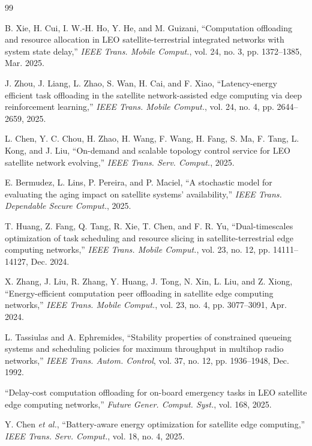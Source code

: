 \documentclass[a4paper,11pt]{article}
\begin{document}
\begin{thebibliography}{99}

B. Xie, H. Cui, I. W.-H. Ho, Y. He, and M. Guizani,
``Computation offloading and resource allocation in LEO
satellite-terrestrial integrated networks with system state delay,''
\textit{IEEE Trans. Mobile Comput.},
vol. 24, no. 3, pp. 1372--1385, Mar. 2025.

J. Zhou, J. Liang, L. Zhao, S. Wan, H. Cai, and F. Xiao,
``Latency-energy efficient task offloading in the satellite
network-assisted edge computing via deep reinforcement learning,''
\textit{IEEE Trans. Mobile Comput.},
vol. 24, no. 4, pp. 2644--2659, 2025.

L. Chen, Y. C. Chou, H. Zhao, H. Wang, F. Wang, H. Fang, S. Ma,
F. Tang, L. Kong, and J. Liu,
``On-demand and scalable topology control service for LEO
satellite network evolving,''
\textit{IEEE Trans. Serv. Comput.}, 2025.

E. Bermudez, L. Lins, P. Pereira, and P. Maciel,
``A stochastic model for evaluating the aging impact on
satellite systems' availability,''
\textit{IEEE Trans. Dependable Secure Comput.}, 2025.

T. Huang, Z. Fang, Q. Tang, R. Xie, T. Chen, and F. R. Yu,
``Dual-timescales optimization of task scheduling and resource
slicing in satellite-terrestrial edge computing networks,''
\textit{IEEE Trans. Mobile Comput.},
vol. 23, no. 12, pp. 14111--14127, Dec. 2024.

X. Zhang, J. Liu, R. Zhang, Y. Huang, J. Tong, N. Xin,
L. Liu, and Z. Xiong,
``Energy-efficient computation peer offloading in satellite
edge computing networks,''
\textit{IEEE Trans. Mobile Comput.},
vol. 23, no. 4, pp. 3077--3091, Apr. 2024.

L. Tassiulas and A. Ephremides,
``Stability properties of constrained queueing systems and scheduling
policies for maximum throughput in multihop radio networks,''
\textit{IEEE Trans. Autom. Control},
vol. 37, no. 12, pp. 1936--1948, Dec. 1992.

``Delay-cost computation offloading for on-board emergency tasks
in LEO satellite edge computing networks,''
\textit{Future Gener. Comput. Syst.}, vol. 168, 2025.

Y. Chen \textit{et al.},
``Battery-aware energy optimization for satellite edge computing,''
\textit{IEEE Trans. Serv. Comput.},
vol. 18, no. 4, 2025.


\end{thebibliography}
\end{document}
